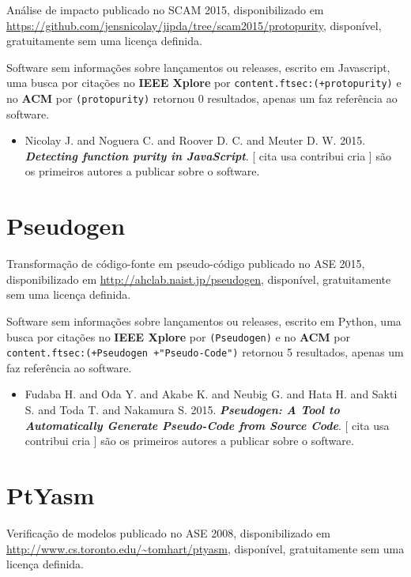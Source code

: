 Análise de impacto
publicado no SCAM 2015,
disponibilizado em \url{https://github.com/jensnicolay/jipda/tree/scam2015/protopurity},
disponível,
gratuitamente
sem uma licença definida.

Software sem informações sobre lançamentos ou releases,
escrito em Javascript,
uma busca por citações no {\bf IEEE Xplore} por
\texttt{content.ftsec:(+protopurity)}
e no {\bf ACM} por
\texttt{(protopurity)}
retornou
0 resultados,
apenas um faz referência ao software.

\begin{itemize}
\item Nicolay J. and Noguera C. and Roover D. C. and Meuter D. W.
      2015.
        \textbf{\textit{ Detecting function purity in JavaScript}}.
      [
          cita
          usa
          contribui
          cria
      ]
são os primeiros autores a publicar sobre o software.
\end{itemize}
\section{Pseudogen}

Transformação de código-fonte em pseudo-código
publicado no ASE 2015,
disponibilizado em \url{http://ahclab.naist.jp/pseudogen},
disponível,
gratuitamente
sem uma licença definida.

Software sem informações sobre lançamentos ou releases,
escrito em Python,
uma busca por citações no {\bf IEEE Xplore} por
\texttt{(Pseudogen)}
e no {\bf ACM} por
\texttt{content.ftsec:(+Pseudogen +"Pseudo-Code")}
retornou
5 resultados,
apenas um faz referência ao software.

\begin{itemize}
\item Fudaba H. and Oda Y. and Akabe K. and Neubig G. and Hata H. and Sakti S. and Toda T. and Nakamura S.
      2015.
        \textbf{\textit{ Pseudogen: A Tool to Automatically Generate Pseudo-Code from Source Code}}.
      [
          cita
          usa
          contribui
          cria
      ]
são os primeiros autores a publicar sobre o software.
\end{itemize}
\section{PtYasm}

Verificação de modelos
publicado no ASE 2008,
disponibilizado em \url{http://www.cs.toronto.edu/~tomhart/ptyasm},
disponível,
gratuitamente
sem uma licença definida.

